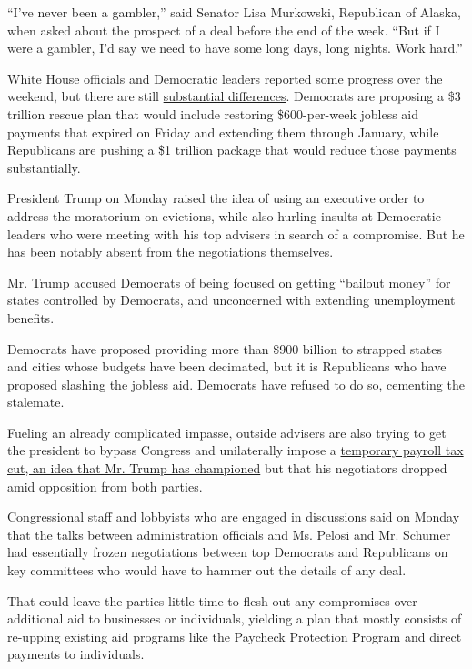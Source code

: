 ``I've never been a gambler,'' said Senator Lisa Murkowski, Republican
of Alaska, when asked about the prospect of a deal before the end of the
week. ``But if I were a gambler, I'd say we need to have some long days,
long nights. Work hard.''

White House officials and Democratic leaders reported some progress over
the weekend, but there are still
\href{https://www.nytimes3xbfgragh.onion/2020/08/02/us/politics/coronavirus-jobless-aid.html}{substantial
differences}. Democrats are proposing a \$3 trillion rescue plan that
would include restoring \$600-per-week jobless aid payments that expired
on Friday and extending them through January, while Republicans are
pushing a \$1 trillion package that would reduce those payments
substantially.

President Trump on Monday raised the idea of using an executive order to
address the moratorium on evictions, while also hurling insults at
Democratic leaders who were meeting with his top advisers in search of a
compromise. But he
\href{https://www.nytimes3xbfgragh.onion/2020/08/03/us/politics/congress-jobless-aid-talks-trump.html}{has
been notably absent from the negotiations} themselves.

Mr. Trump accused Democrats of being focused on getting ``bailout
money'' for states controlled by Democrats, and unconcerned with
extending unemployment benefits.

Democrats have proposed providing more than \$900 billion to strapped
states and cities whose budgets have been decimated, but it is
Republicans who have proposed slashing the jobless aid. Democrats have
refused to do so, cementing the stalemate.

Fueling an already complicated impasse, outside advisers are also trying
to get the president to bypass Congress and unilaterally impose a
\href{https://www.nytimes3xbfgragh.onion/2020/07/23/business/payroll-tax-cut-trump-recession.html}{temporary
payroll tax cut, an idea that Mr. Trump has championed} but that his
negotiators dropped amid opposition from both parties.

Congressional staff and lobbyists who are engaged in discussions said on
Monday that the talks between administration officials and Ms. Pelosi
and Mr. Schumer had essentially frozen negotiations between top
Democrats and Republicans on key committees who would have to hammer out
the details of any deal.

That could leave the parties little time to flesh out any compromises
over additional aid to businesses or individuals, yielding a plan that
mostly consists of re-upping existing aid programs like the Paycheck
Protection Program and direct payments to individuals.

